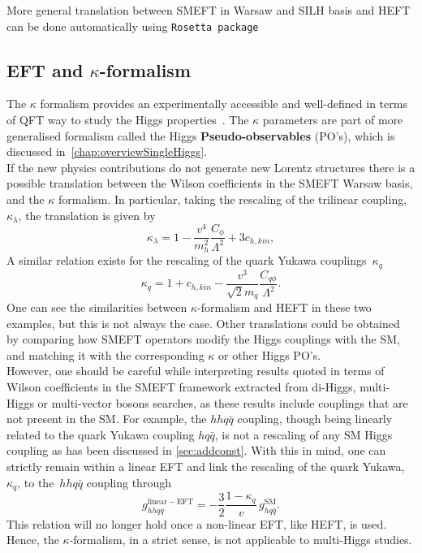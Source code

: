 More general translation between SMEFT in Warsaw and SILH basis and HEFT can be done automatically using \texttt{Rosetta package}~\cite{Falkowski:2015wza}
\subsection{EFT and $\kappa$-formalism}
The $\kappa$ formalism provides an experimentally accessible and well-defined in terms of QFT way to study the Higgs properties~\cite{Gonzalez-Alonso:2014eva}. The $\kappa$ parameters are part of more generalised formalism called the Higgs \textbf{Pseudo-observables} (PO's), which is discussed in~\autoref{chap:overviewSingleHiggs}.\\ 
 If the new physics contributions do not generate new Lorentz structures there is a possible translation between the Wilson coefficients in the SMEFT Warsaw basis, and the $\kappa$ formalism. In particular, taking the rescaling of the trilinear coupling, $\kappa_\lambda$, the translation is given by
 \begin{equation}
	     \kappa_\lambda = 1-\frac{v^4}{m_h^2} \frac{C_\phi}{\Lambda^2}+3 c_{h,kin},
	 \end{equation}
 A similar relation exists for the rescaling of the quark Yukawa couplings~$\kappa_q$
 \begin{equation}
	   \kappa_q = 1+c_{h,kin}- \frac{v^3}{\sqrt{2}m_q}\frac{C_{q\phi}}{\Lambda^2}.
	 \end{equation}
One can see the similarities between $\kappa$-formalism and HEFT in these two examples, but this is not always the case.  Other translations could be obtained by comparing how SMEFT operators modify the Higgs couplings with the SM, and matching it with the corresponding $\kappa$ or other Higgs PO's.\\ 
 However, one should be careful while interpreting results quoted in terms of Wilson coefficients in the SMEFT framework extracted from di-Higgs, multi-Higgs or multi-vector bosons searches, as these results include couplings that are not present in the SM. For example, the $hh q\bar{q}$ coupling, though being linearly related to the quark Yukawa coupling $h q\bar{q}$, is not a rescaling of any SM Higgs coupling as has been discussed in \autoref{sec:addconst}. With this in mind, one can strictly remain within a linear EFT and link the rescaling of the quark Yukawa, $\kappa_q$, to the~$hh q\bar{q}$ coupling through
 \begin{equation}
	   g_{hhq\bar{q}}^{\mathrm{linear-EFT}} = -\frac{3}{2}\frac{1-\kappa_q}{v} \, g_{h q\bar{q}}^{\mathrm{SM}}.
	 \end{equation}
 This relation will no longer hold once a non-linear EFT, like HEFT, is used. Hence, the $\kappa$-formalism, in a strict sense, is not applicable to multi-Higgs studies.
